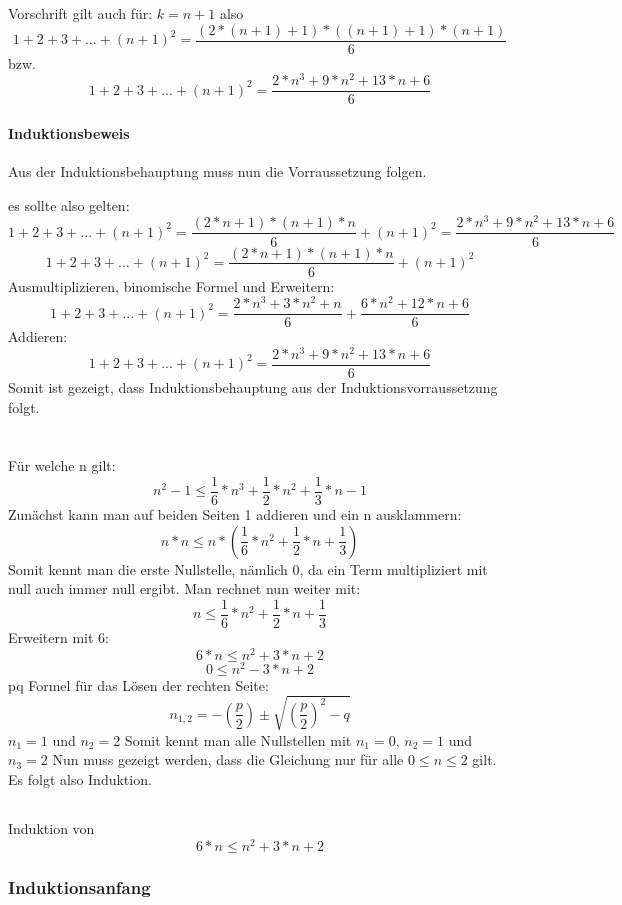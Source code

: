 \documentclass{article}
\begin{document}
Vorschrift gilt auch für: $k=n+1$ also \[1+2+3+...+(n+1)^2 = \frac{(2*(n+1)+1)*((n+1)+1)*(n+1)}{6} \]
bzw.
\[1+2+3+...+(n+1)^2 = \frac{2*n^3+9*n^2+13*n+6}{6} \]
\clearpage
\paragraph{Induktionsbeweis}\mbox{}

Aus der Induktionsbehauptung muss nun die Vorraussetzung folgen.

es sollte also gelten: \[1+2+3+...+(n+1)^2 = \frac{(2*n+1)*(n+1)*n}{6} + (n+1)^2= \frac{2*n^3+9*n^2+13*n+6}{6}\]
\[1+2+3+...+(n+1)^2 = \frac{(2*n+1)*(n+1)*n}{6}+(n+1)^2 \]
Ausmultiplizieren, binomische Formel und Erweitern:
\[1+2+3+...+(n+1)^2 = \frac{2*n^3+3*n^2+n}{6}+\frac{6*n^2+12*n+6}{6} \]
Addieren:
\[1+2+3+...+(n+1)^2 =  \frac{2*n^3+9*n^2+13*n+6}{6} \]
\newline
Somit ist gezeigt, dass Induktionsbehauptung aus der Induktionsvorraussetzung folgt.

\section{}
\subsection{}
Für welche n gilt:
\[n^2-1 \le \frac{1}{6}*n^3+\frac{1}{2}*n^2+\frac{1}{3}*n-1\]
Zunächst kann man auf beiden Seiten 1 addieren und ein n ausklammern:
\[n*n \le n*(\frac{1}{6}*n^2+\frac{1}{2}*n+\frac{1}{3})\]
Somit kennt man die erste Nullstelle, nämlich 0, da ein Term multipliziert mit null auch immer null ergibt.
Man rechnet nun weiter mit:
\[n \le \frac{1}{6}*n^2+\frac{1}{2}*n+\frac{1}{3}\]
Erweitern mit 6:
\[6*n \le n^2+3*n+2\]
\[0 \le n^2-3*n+2\]
pq Formel für das Lösen der rechten Seite: \[n_{1,2} = -\left(\frac{p}{2}\right) \pm \sqrt{ \left(\frac{p}{2}\right)^{2}-q} \]
 $n_1=1$ und  $n_2=2$
 \newline
 Somit kennt man alle Nullstellen mit $n_1=0$,  $n_2=1$ und  $n_3=2$
 \newline
 Nun muss gezeigt werden, dass die Gleichung nur für alle  $0\le n \le 2$ gilt. Es folgt also Induktion.
 \subsection{}
Induktion von \[6*n \le n^2+3*n+2\]
\subsubsection{Induktionsanfang}
\end{document}
